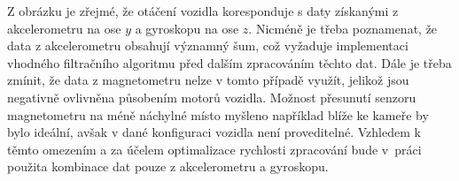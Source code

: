 Z obrázku je zřejmé, že otáčení vozidla koresponduje s daty získanými
z akcelerometru na ose $y$ a gyroskopu na ose $z$. Nicméně je třeba poznamenat, že
data z akcelerometru obsahují významný šum, což vyžaduje implementaci vhodného
filtračního algoritmu před dalším zpracováním těchto dat. Dále je třeba zmínit, že
data z magnetometru nelze v tomto případě využít, jelikož jsou negativně ovlivněna
působením motorů vozidla. Možnost přesunutí senzoru magnetometru na méně náchylné
místo myšleno například blíže ke kameře by bylo ideální, avšak v dané konfiguraci
vozidla není proveditelné. Vzhledem k těmto omezením a za účelem optimalizace
rychlosti zpracování bude v~práci použita kombinace dat pouze z akcelerometru a
gyroskopu.

\endinput
